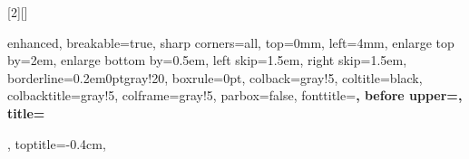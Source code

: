 
[2][]{
    enhanced,
    breakable=true,
    sharp corners=all,
    top=0mm, 
    left=4mm,
    enlarge top by=2em,
    enlarge bottom by=0.5em,
    left skip=1.5em,
    right skip=1.5em,
    borderline={0.2em}{0pt}{gray!20}, 
    boxrule=0pt,
    colback=gray!5,
    coltitle=black,
    colbacktitle=gray!5,
    colframe=gray!5,
    parbox=false,
    fonttitle=\bfseries,
    before upper={\vskip -0cm},
    title={{}
          },
    toptitle=-0.4cm,
}

\renewenvironment{proof}[1][]{%
    \begin{proofframe}{#1}\relax%
    }{\end{proofframe}}

 
    

\renewenvironment{fact}[1][]{%
   \refstepcounter{theorem}
    \ifstrempty{#1}%
    {\mdfsetup{%
    frametitle={%
        \tikz
        \node[anchor=east,rectangle,fill=theoremcolor!70]{Fact~\thetheorem};}} 
    }%
    {\mdfsetup{%
    frametitle={%
        \tikz
        \node[anchor=east,rectangle,fill=theoremcolor!70] {Fact~\thetheorem:~#1};}}%
    }%
    \mdfsetup{innertopmargin=0.2em,linecolor=theoremcolor!70, linewidth=0.2em, nobreak=true,
    topline=true, frametitleaboveskip=-0.9em,}
    \begin{mdframed}[]\relax%
    }{\end{mdframed}
}


\renewenvironment{theorem}[1][]{%
   \refstepcounter{theorem}
    \ifstrempty{#1}%
    {\mdfsetup{%
    frametitle={%
        \tikz
        \node[anchor=east,rectangle,fill=theoremcolor!70]{Theorem~\thetheorem};}} 
    }%
    {\mdfsetup{%
    frametitle={%
        \tikz
        \node[anchor=east,rectangle,fill=theoremcolor!70] {Theorem~\thetheorem:~#1};}}%
    }%
    \mdfsetup{innertopmargin=0.2em,linecolor=theoremcolor!70, linewidth=0.2em, nobreak=true,
    topline=true, frametitleaboveskip=-0.9em,}
    \begin{mdframed}[]\relax%
    }{\end{mdframed}
}

